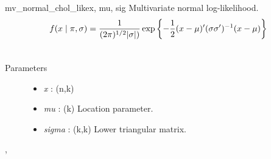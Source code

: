 \hypertarget{pymc.distributions.mv_normal_chol_like}{}\begin{funcdesc}{mv\_normal\_chol\_like}{x, mu, sig}
Multivariate normal log-likelihood.
\begin{gather}
\begin{split}f(x \mid \pi, \sigma) = \frac{1}{(2\pi)^{1/2}|\sigma|)} \exp\left\{ -\frac{1}{2} (x-\mu)^{\prime}(\sigma \sigma^{\prime})^{-1}(x-\mu) \right\}\end{split}\notag\\\begin{split}\end{split}\notag
\end{gather}\begin{description}
\item[Parameters] \leavevmode\begin{itemize}
\item {}
\emph{x} : (n,k)

\item {}
\emph{mu} : (k) Location parameter.

\item {}
\emph{sigma} : (k,k) Lower triangular matrix.

\end{itemize}

\end{description}




\hyperlink{pymc.distributions.mv_normal_like}{}, \hyperlink{pymc.distributions.mv_normal_cov_like}{}


\end{funcdesc}

